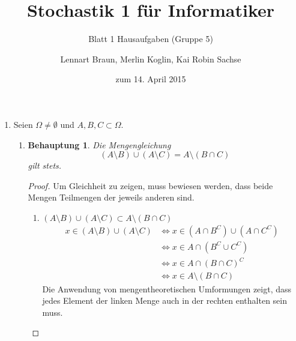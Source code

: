 \documentclass[a4paper]{scrartcl}
\title{Stochastik 1 für Informatiker}
\subtitle{Blatt 1 Hausaufgaben (Gruppe 5)}
\author{
    Lennart Braun,
    Merlin Koglin,
    Kai Robin Sachse
}
\date{zum 14. April 2015}
\newtheorem*{behaupt}{Behauptung}
\newcommand{\gdw}{\Leftrightarrow}
\begin{document}

\begin{enumerate}[label=\bfseries\arabic*.]
    \item
        Seien $\Omega \neq \emptyset$ und $A,B,C \subset \Omega$.
        \begin{enumerate}[label=(\alph*)]
            \item
                \begin{behaupt}
                    Die Mengengleichung
                    \begin{equation}
                        (A \setminus B) \cup (A \setminus C)
                        = A \setminus (B \cap C)
                    \end{equation}
                    gilt stets.
                \end{behaupt}
                \begin{proof}
                    Um Gleichheit zu zeigen, muss bewiesen werden, dass beide
                    Mengen Teilmengen der jeweils anderen sind.
                    \begin{enumerate}
                        \item
                            $(A \setminus B) \cup (A \setminus C)
                            \subset A \setminus (B \cap C)$ \\
                            \begin{equation}
                                \begin{split}
                                    x \in (A \setminus B) \cup (A \setminus C)
                                    &\gdw x \in (A \cap B^C) \cup (A \cap C^C)\\
                                    &\gdw x \in A \cap (B^C \cup C^C) \\
                                    &\gdw x \in A \cap (B \cap C)^C \\
                                    &\gdw x \in A \setminus (B \cap C)
                                \end{split}
                            \end{equation}
                            Die Anwendung von mengentheoretischen Umformungen
                            zeigt, dass jedes Element der linken Menge auch in
                            der rechten enthalten sein muss.


\end{enumerate}
\end{proof}
\end{enumerate}
\end{enumerate}
\end{document}
